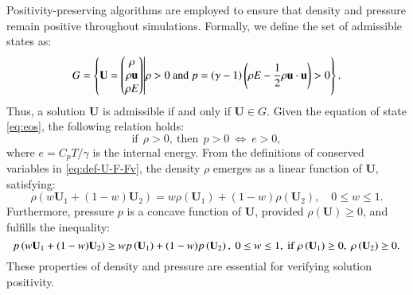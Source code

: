 Positivity-preserving algorithms are employed to ensure that density and pressure remain positive throughout simulations. Formally, we define the set of admissible states as:
\begin{equation}
    G= \left\{
    \mathbf{U} =  \begin{pmatrix}
        \rho \\ \rho \mathbf{u} \\ \rho E
    \end{pmatrix} \middle|
    \rho >  0
    \text{ and }
    p=\left(\gamma-1\right) \left(\rho E - \dfrac{1}{2} \rho \mathbf{u} \cdot \mathbf{u}\right) >  0
    \right\}.
\end{equation}
Thus, a solution $\mathbf{U}$ is admissible if and only if $\mathbf{U} \in G$.
Given the equation of state \eqref{eq:eos}, the following relation holds:
\begin{equation}
    \mathrm{if} \ \ \rho>0, \ \mathrm{then} \ \ p>0 \ \Leftrightarrow \ e >0,  
\end{equation}
where $e = C_p T / \gamma$ is the internal energy.
From the definitions of conserved variables in \eqref{eq:def-U-F-Fv}, the density $\rho$ emerges as a linear function of $\mathbf{U}$, satisfying:
\begin{equation}\label{eq:density-linear}
\rho\left(w\mathbf{U}_1 + (1 - w)\mathbf{U}_2\right) = w\rho(\mathbf{U}_1) + (1 - w)\rho(\mathbf{U}_2), \quad 0 \leq w \leq 1.
\end{equation}
Furthermore, pressure $p$ is a concave function of $\mathbf{U}$, provided $\rho(\mathbf{U}) \geq 0$, and fulfills the inequality:
\begin{equation}
    \label{eq:pressure-Jensen}
    p \left(w\U_1+(1-w)\U_2\right)  \geq w p\left(\U_1\right) + (1-w) p \left(\U_2\right), \ 0 \leq w \leq 1, \ \mathrm{if} \ \rho\left(\U_1\right) \geq 0, \ \rho\left(\U_2\right) \geq 0.
\end{equation}
These properties of density and pressure are essential for verifying solution positivity.

